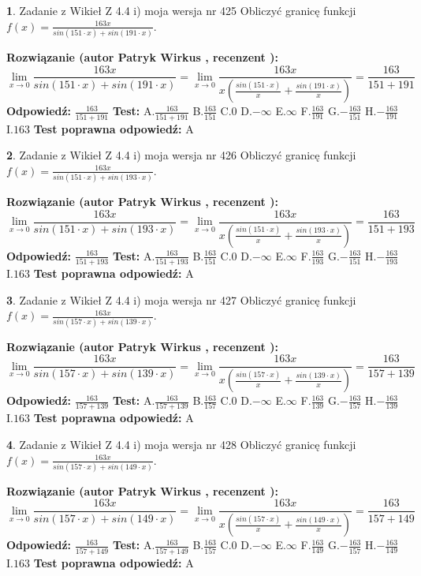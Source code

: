 \documentclass[12pt, a4paper]{article}
\theoremstyle{definition} %
\newtheorem{zad}{}
\newcommand{\zadStart}[1]{\begin{zad}#1\newline}
\newcommand{\zadStop}{\end{zad}}
\newcommand{\rozwStart}[2]{\noindent \textbf{Rozwiązanie (autor #1 , recenzent #2): }\newline}
\newcommand{\rozwStop}{\newline}
\newcommand{\odpStart}{\noindent \textbf{Odpowiedź:}\newline}
\newcommand{\odpStop}{\newline}
\newcommand{\testStart}{\noindent \textbf{Test:}\newline}
\newcommand{\testStop}{\newline}
\newcommand{\kluczStart}{\noindent \textbf{Test poprawna odpowiedź:}\newline}
\newcommand{\kluczStop}{\newline}
\begin{document}
\zadStart{Zadanie z Wikieł Z 4.4 i) moja wersja nr 425}
Obliczyć granicę funkcji $f(x)=\frac{163x}{sin(151\cdot x) +sin(191\cdot x)}$.
\zadStop
\rozwStart{Patryk Wirkus}{}
$$\lim\limits_{x\to 0}\frac{163x}{sin(151\cdot x) +sin(191\cdot x)}=\lim\limits_{x\to 0}\frac{163x}{x(\frac{sin(151\cdot x)}{x}+\frac{sin(191\cdot x)}{x})}=\frac{163}{151+191}$$
\rozwStop
\odpStart
$\frac{163}{151+191}$
\odpStop
\testStart
A.$\frac{163}{151+191}$
B.$\frac{163}{151}$
C.$0$
D.$-\infty$
E.$\infty$
F.$\frac{163}{191}$
G.$-\frac{163}{151}$
H.$-\frac{163}{191}$
I.$163$
\testStop
\kluczStart
A
\kluczStop



\zadStart{Zadanie z Wikieł Z 4.4 i) moja wersja nr 426}
Obliczyć granicę funkcji $f(x)=\frac{163x}{sin(151\cdot x) +sin(193\cdot x)}$.
\zadStop
\rozwStart{Patryk Wirkus}{}
$$\lim\limits_{x\to 0}\frac{163x}{sin(151\cdot x) +sin(193\cdot x)}=\lim\limits_{x\to 0}\frac{163x}{x(\frac{sin(151\cdot x)}{x}+\frac{sin(193\cdot x)}{x})}=\frac{163}{151+193}$$
\rozwStop
\odpStart
$\frac{163}{151+193}$
\odpStop
\testStart
A.$\frac{163}{151+193}$
B.$\frac{163}{151}$
C.$0$
D.$-\infty$
E.$\infty$
F.$\frac{163}{193}$
G.$-\frac{163}{151}$
H.$-\frac{163}{193}$
I.$163$
\testStop
\kluczStart
A
\kluczStop



\zadStart{Zadanie z Wikieł Z 4.4 i) moja wersja nr 427}
Obliczyć granicę funkcji $f(x)=\frac{163x}{sin(157\cdot x) +sin(139\cdot x)}$.
\zadStop
\rozwStart{Patryk Wirkus}{}
$$\lim\limits_{x\to 0}\frac{163x}{sin(157\cdot x) +sin(139\cdot x)}=\lim\limits_{x\to 0}\frac{163x}{x(\frac{sin(157\cdot x)}{x}+\frac{sin(139\cdot x)}{x})}=\frac{163}{157+139}$$
\rozwStop
\odpStart
$\frac{163}{157+139}$
\odpStop
\testStart
A.$\frac{163}{157+139}$
B.$\frac{163}{157}$
C.$0$
D.$-\infty$
E.$\infty$
F.$\frac{163}{139}$
G.$-\frac{163}{157}$
H.$-\frac{163}{139}$
I.$163$
\testStop
\kluczStart
A
\kluczStop



\zadStart{Zadanie z Wikieł Z 4.4 i) moja wersja nr 428}
Obliczyć granicę funkcji $f(x)=\frac{163x}{sin(157\cdot x) +sin(149\cdot x)}$.
\zadStop
\rozwStart{Patryk Wirkus}{}
$$\lim\limits_{x\to 0}\frac{163x}{sin(157\cdot x) +sin(149\cdot x)}=\lim\limits_{x\to 0}\frac{163x}{x(\frac{sin(157\cdot x)}{x}+\frac{sin(149\cdot x)}{x})}=\frac{163}{157+149}$$
\rozwStop
\odpStart
$\frac{163}{157+149}$
\odpStop
\testStart
A.$\frac{163}{157+149}$
B.$\frac{163}{157}$
C.$0$
D.$-\infty$
E.$\infty$
F.$\frac{163}{149}$
G.$-\frac{163}{157}$
H.$-\frac{163}{149}$
I.$163$
\testStop
\kluczStart
A
\kluczStop
\end{document}
